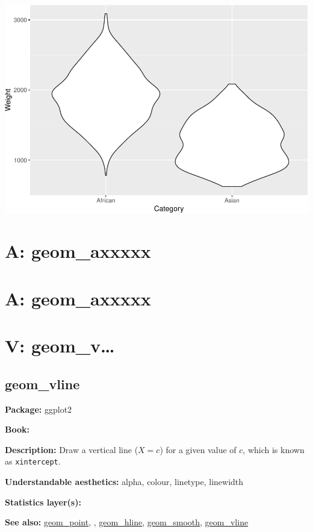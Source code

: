 \documentclass[
]{book}
\begin{document}
\includegraphics{Data-Visualisation-geom-Encyclopedia_files/figure-latex/unnamed-chunk-51-1.pdf}

\hypertarget{a-geom_axxxxx-7}{%
\chapter{A: geom\_axxxxx}\label{a-geom_axxxxx-7}}

\hypertarget{a-geom_axxxxx-8}{%
\chapter{A: geom\_axxxxx}\label{a-geom_axxxxx-8}}

\hypertarget{v-geom_v}{%
\chapter{V: geom\_v\ldots{}}\label{v-geom_v}}

\hypertarget{vline}{%
\section{geom\_vline}\label{vline}}

\textbf{Package: } ggplot2 \autocite{R-ggplot2}

\textbf{Book: }

\textbf{Description: } Draw a vertical line (\(X=c\)) for a given value of \(c\), which is known as \texttt{xintercept}.

\textbf{Understandable aesthetics:} alpha, colour, linetype, linewidth

\textbf{Statistics layer(s):}

\textbf{See also: } \protect\hyperlink{point}{geom\_point}, , \protect\hyperlink{hline}{geom\_hline}, \protect\hyperlink{smooth}{geom\_smooth}, \protect\hyperlink{vline}{geom\_vline}
\end{document}
